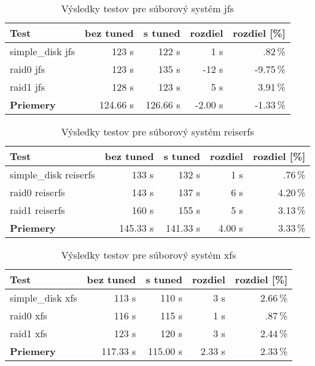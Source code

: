 \begin{table}[H]
\begin{center}
\begin{tabular}{|l|r|r|r|r|}
    \hline
    \textbf{Test} & \textbf{bez tuned} & \textbf{s tuned} & \textbf{rozdiel} & \textbf{rozdiel [\%]} \\ \hline
    simple\_disk jfs & 123 s & 122 s & 1 s & .82\,\% \\
    \hline
    raid0 jfs & 123 s & 135 s & -12 s & -9.75\,\% \\
    \hline
    raid1 jfs & 128 s & 123 s & 5 s & 3.91\,\% \\
    \hline
    \textbf{Priemery} & 124.66 s & 126.66 s & -2.00 s & -1.33\,\% \\
    \hline
\end{tabular}
\caption{Výsledky testov pre súborový systém jfs}
\label{tab:results-jfs}
\end{center}
\end{table}

\begin{table}[H]
\begin{center}
\begin{tabular}{|l|r|r|r|r|}
    \hline
    \textbf{Test} & \textbf{bez tuned} & \textbf{s tuned} & \textbf{rozdiel} & \textbf{rozdiel [\%]} \\ \hline
    simple\_disk reiserfs & 133 s & 132 s & 1 s & .76\,\% \\
    \hline
    raid0 reiserfs & 143 s & 137 s & 6 s & 4.20\,\% \\
    \hline
    raid1 reiserfs & 160 s & 155 s & 5 s & 3.13\,\% \\
    \hline
    \textbf{Priemery} & 145.33 s & 141.33 s & 4.00 s & 3.33\,\% \\
    \hline
\end{tabular}
\caption{Výsledky testov pre súborový systém reiserfs}
\label{tab:results-reiserfs}
\end{center}
\end{table}

\begin{table}[H]
\begin{center}
\begin{tabular}{|l|r|r|r|r|}
    \hline
    \textbf{Test} & \textbf{bez tuned} & \textbf{s tuned} & \textbf{rozdiel} & \textbf{rozdiel [\%]} \\ \hline
    simple\_disk xfs & 113 s & 110 s & 3 s & 2.66\,\% \\
    \hline
    raid0 xfs & 116 s & 115 s & 1 s & .87\,\% \\
    \hline
    raid1 xfs & 123 s & 120 s & 3 s & 2.44\,\% \\
    \hline
    \textbf{Priemery} & 117.33 s & 115.00 s & 2.33 s & 2.33\,\% \\
    \hline
\end{tabular}
\caption{Výsledky testov pre súborový systém xfs}
\label{tab:results-xfs}
\end{center}
\end{table}

